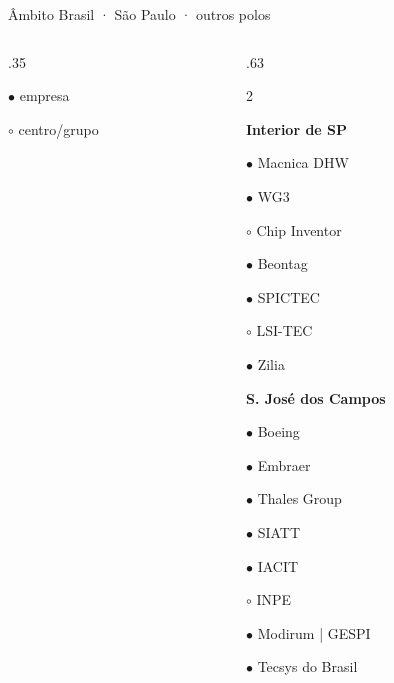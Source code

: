 \begin{frame}{Âmbito Brasil · São Paulo · outros polos}
\begin{columns}[T,onlytextwidth]
\begin{column}{.35\textwidth}
{\tiny $\bullet$ empresa\par $\circ$ centro/grupo}
\end{column}
\begin{column}{.63\textwidth}
\footnotesize\setlength{\columnsep}{3mm}\begin{multicols}{2}\raggedright
\textcolor{blue_theme}{\textbf{Interior de SP}}\par\smallskip
\noindent\parbox{\linewidth}{$\bullet$ Macnica DHW}\par
\noindent\parbox{\linewidth}{$\bullet$ WG3}\par
\noindent\parbox{\linewidth}{$\circ$ Chip Inventor}\par
\noindent\parbox{\linewidth}{$\bullet$ Beontag}\par
\noindent\parbox{\linewidth}{$\bullet$ SPICTEC}\par
\noindent\parbox{\linewidth}{$\circ$ LSI-TEC}\par
\noindent\parbox{\linewidth}{$\bullet$ Zilia}\par
\medskip
\textcolor{blue_theme}{\textbf{S. José dos Campos}}\par\smallskip
\noindent\parbox{\linewidth}{$\bullet$ Boeing}\par
\noindent\parbox{\linewidth}{$\bullet$ Embraer}\par
\noindent\parbox{\linewidth}{$\bullet$ Thales Group}\par
\noindent\parbox{\linewidth}{$\bullet$ SIATT}\par
\noindent\parbox{\linewidth}{$\bullet$ IACIT}\par
\noindent\parbox{\linewidth}{$\circ$ INPE}\par
\noindent\parbox{\linewidth}{$\bullet$ Modirum | GESPI}\par
\noindent\parbox{\linewidth}{$\bullet$ Tecsys do Brasil}\par
\medskip
\end{multicols}
\end{column}
\end{columns}
\creditoBrasil
\end{frame}
